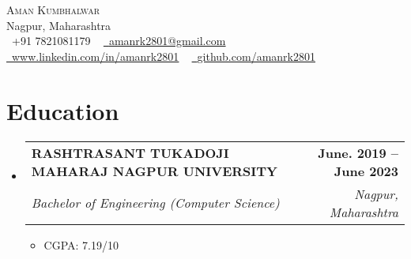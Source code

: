 \documentclass[letterpaper,11pt]{article}
\makeatletter
\newcommand{\resumeItem}[1]{
  \item\small{
    {#1 \vspace{-2pt}}
  }
}
\newcommand{\resumeSubheading}[4]{
  \vspace{-2pt}\item
    \begin{tabular*}{1.0\textwidth}[t]{l@{\extracolsep{\fill}}r}
      \textbf{#1} & \textbf{\small #2} \\
      \textit{\small#3} & \textit{\small #4} \\
    \end{tabular*}\vspace{-7pt}
}
\newcommand{\resumeSubHeadingListStart}{\begin{itemize}[leftmargin=0.0in, label={}]}
\newcommand{\resumeSubHeadingListEnd}{\end{itemize}}
\newcommand{\resumeItemListStart}{\begin{itemize}}
\newcommand{\resumeItemListEnd}{\end{itemize}\vspace{-5pt}}
\makeatother
\begin{document}

\begin{center}
    {\Huge \scshape Aman Kumbhalwar} \\ \vspace{1pt}
    Nagpur, Maharashtra \\ \vspace{1pt}
    \small \raisebox{-0.1\height}\faPhone\ +91 7821081179 ~ \href{mailto:amanrk2801@gmail.com}{\raisebox{-0.2\height}\faEnvelope\  \underline{amanrk2801@gmail.com}} ~ 
    \href{https://linkedin.com/in//}{\raisebox{-0.2\height}\faLinkedin\ \underline{www.linkedin.com/in/amanrk2801}}  ~
    \href{https://github.com/}{\raisebox{-0.2\height}\faGithub\ \underline{github.com/amanrk2801}}
    \vspace{-8pt}
\end{center}


\section{Education}
  \resumeSubHeadingListStart
    \resumeSubheading
      {RASHTRASANT TUKADOJI MAHARAJ NAGPUR UNIVERSITY}{June. 2019 -- June 2023}
      {Bachelor of Engineering (Computer Science)}{Nagpur, Maharashtra}
      \resumeItemListStart
        \resumeItem{CGPA: 7.19/10}
      \resumeItemListEnd
  \resumeSubHeadingListEnd


\end{document}
